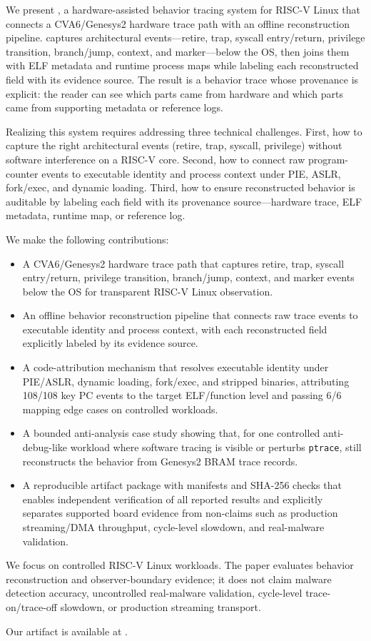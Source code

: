 We present \rvmt, a hardware-assisted behavior tracing system for RISC-V Linux
that connects a CVA6/Genesys2 hardware trace path with an offline reconstruction
pipeline. \rvmt captures architectural events---retire, trap, syscall
entry/return, privilege transition, branch/jump, context, and marker---below the
OS, then joins them with ELF metadata and runtime process maps while labeling
each reconstructed field with its evidence source. The result is a behavior trace
whose provenance is explicit: the reader can see which parts came from hardware
and which parts came from supporting metadata or reference logs.

Realizing this system requires addressing three technical challenges. First, how
to capture the right architectural events (retire, trap, syscall, privilege)
without software interference on a RISC-V core. Second, how to connect raw
program-counter events to executable identity and process context under PIE, ASLR,
fork/exec, and dynamic loading. Third, how to ensure reconstructed behavior is
auditable by labeling each field with its provenance source---hardware trace, ELF
metadata, runtime map, or reference log.

We make the following contributions:

\begin{itemize}
  \item A CVA6/Genesys2 hardware trace path that captures retire, trap, syscall
  entry/return, privilege transition, branch/jump, context, and marker events
  below the OS for transparent RISC-V Linux observation.
  \item An offline behavior reconstruction pipeline that connects raw trace events
  to executable identity and process context, with each reconstructed field
  explicitly labeled by its evidence source.
  \item A code-attribution mechanism that resolves executable identity under
  PIE/ASLR, dynamic loading, fork/exec, and stripped binaries, attributing
  108/108 key PC events to the target ELF/function level and passing 6/6
  mapping edge cases on controlled workloads.
  \item A bounded anti-analysis case study showing that, for one controlled
  anti-debug-like workload where software tracing is visible or perturbs
  \texttt{ptrace}, \rvmt still reconstructs the behavior from Genesys2 BRAM
  trace records.
  \item A reproducible artifact package with manifests and SHA-256 checks that
  enables independent verification of all reported results and explicitly
  separates supported board evidence from non-claims such as production
  streaming/DMA throughput, cycle-level slowdown, and real-malware validation.
\end{itemize}

We focus on controlled RISC-V Linux workloads. The paper evaluates behavior
reconstruction and observer-boundary evidence; it does not claim malware
detection accuracy, uncontrolled real-malware validation, cycle-level
trace-on/trace-off slowdown, or production streaming transport.

Our artifact is available at \artifactroot.
